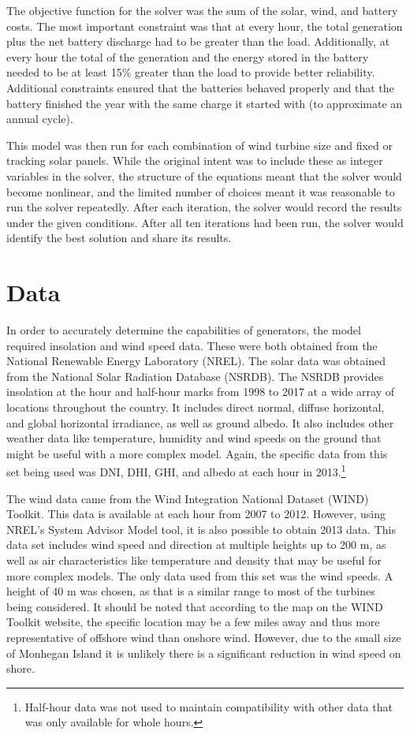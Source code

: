 \documentclass{article}
\begin{document}
The objective function for the solver was the sum of the solar, wind, and battery costs.  The most important constraint was that at every hour, the total generation plus the net battery discharge had to be greater than the load.  Additionally, at every hour the total of the generation and the energy stored in the battery needed to be at least 15\% greater than the load to provide better reliability.  Additional constraints ensured that the batteries behaved properly and that the battery finished the year with the same charge it started with (to approximate an annual cycle).

This model was then run for each combination of wind turbine size and fixed or tracking solar panels.  While the original intent was to include these as integer variables in the solver, the structure of the equations meant that the solver would become nonlinear, and the limited number of choices meant it was reasonable to run the solver repeatedly.  After each iteration, the solver would record the results under the given conditions.  After all ten iterations had been run, the solver would identify the best solution and share its results.

\section{Data}

In order to accurately determine the capabilities of generators, the model required insolation and wind speed data.  These were both obtained from the National Renewable Energy Laboratory (NREL).  The solar data was obtained from the National Solar Radiation Database (NSRDB).\cite{NSRDB}  The NSRDB provides insolation at the hour and half-hour marks from 1998 to 2017 at a wide array of locations throughout the country.  It includes direct normal, diffuse horizontal, and global horizontal irradiance, as well as ground albedo.  It also includes other weather data like temperature, humidity and wind speeds on the ground that might be useful with a more complex model.  Again, the specific data from this set being used was DNI, DHI, GHI, and albedo at each hour in 2013.\footnote{Half-hour data was not used to maintain compatibility with other data that was only available for whole hours.}

The wind data came from the Wind Integration National Dataset (WIND) Toolkit.\cite{WIND}  This data is available at each hour from 2007 to 2012.  However, using NREL's System Advisor Model tool, it is also possible to obtain 2013 data.  This data set includes wind speed and direction at multiple heights up to 200 m, as well as air characteristics like temperature and density that may be useful for more complex models.  The only data used from this set was the wind speeds.  A height of 40 m was chosen, as that is a similar range to most of the turbines being considered.  It should be noted that according to the map on the WIND Toolkit website, the specific location may be a few miles away and thus more representative of offshore wind than onshore wind.  However, due to the small size of Monhegan Island it is unlikely there is a significant reduction in wind speed on shore.
\end{document}
